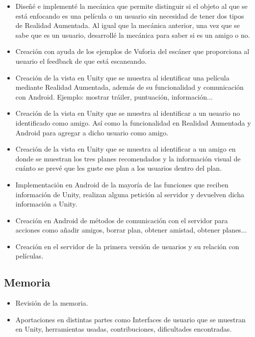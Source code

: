 \begin{itemize}
                    \item Diseñé e implementé la mecánica que permite distinguir si el objeto al que se está enfocando es una película o un usuario sin necesidad de 
                    tener dos tipos de Realidad Aumentada. Al igual que la mecánica anterior, una vez que se sabe que es un usuario, desarrollé la mecánica para saber si es un amigo o no.
                    \item Creación con ayuda de los ejemplos de Vuforia del escáner que proporciona al usuario el feedback de que está escaneando.
                    \item Creación de la vista en Unity que se muestra al identificar una película mediante Realidad Aumentada, además de su funcionalidad y comunicación 
                    con Android. Ejemplo: mostrar tráiler, puntuación, información...
                    \item Creación de la vista en Unity que se muestra al identificar a un usuario no identificado como amigo. Así como la funcionalidad en Realidad Aumentada 
                    y Android para agregar a dicho usuario como amigo.
                    \item Creación de la vista en Unity que se muestra al identificar a un amigo en donde se muestran los tres planes recomendados y la información visual de cuánto 
                    se prevé que les guste ese plan a los usuarios dentro del plan.
                    \item Implementación en Android de la mayoría de las funciones que reciben información de Unity, realizan alguna petición al servidor y devuelven dicha información a Unity.
                    \item Creación en Android de métodos de comunicación con el servidor para acciones como añadir amigos, borrar plan, obtener amistad, obtener planes...
                    \item Creación en el servidor de la primera versión de usuarios y su relación con películas.
                \end{itemize}
            \subsection{Memoria}
            \label{makereference7.3.3}
                \begin{itemize}
                    \item Revisión de la memoria.
                    \item Aportaciones en distintas partes como Interfaces de usuario que se muestran en Unity, herramientas usadas, contribuciones, dificultades encontradas.
                \end{itemize}
        
